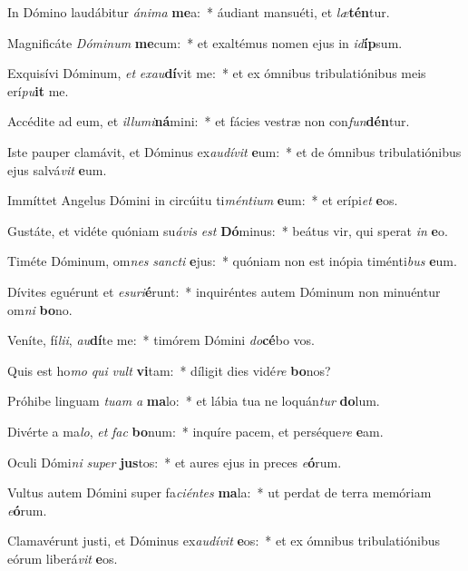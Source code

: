 \item In Dómino laudábitur \textit{á}\textit{ni}\textit{ma} \textbf{me}a:~* áudiant mansuéti, et \textit{læ}\textbf{tén}tur.
\item Magnificáte \textit{Dó}\textit{mi}\textit{num} \textbf{me}cum:~* et exaltémus nomen ejus in \textit{id}\textbf{íp}sum.
\item Exquisívi Dóminum, \textit{et} \textit{ex}\textit{au}\textbf{dí}vit me:~* et ex ómnibus tribulatiónibus meis erí\textit{pu}\textbf{it} me.
\item Accédite ad eum, et \textit{il}\textit{lu}\textit{mi}\textbf{ná}mini:~* et fácies vestræ non con\textit{fun}\textbf{dén}tur.
\item Iste pauper clamávit, et Dóminus ex\textit{au}\textit{dí}\textit{vit} \textbf{e}um:~* et de ómnibus tribulatiónibus ejus salvá\textit{vit} \textbf{e}um.
\item Immíttet Angelus Dómini in circúitu ti\textit{mén}\textit{ti}\textit{um} \textbf{e}um:~* et erípi\textit{et} \textbf{e}os.
\item Gustáte, et vidéte quóniam su\textit{á}\textit{vis} \textit{est} \textbf{Dó}minus:~* beátus vir, qui sperat \textit{in} \textbf{e}o.
\item Timéte Dóminum, om\textit{nes} \textit{sanc}\textit{ti} \textbf{e}jus:~* quóniam non est inópia timénti\textit{bus} \textbf{e}um.
\item Dívites eguérunt et \textit{e}\textit{su}\textit{ri}\textbf{é}runt:~* inquiréntes autem Dóminum non minuéntur om\textit{ni} \textbf{bo}no.
\item Veníte, fí\textit{li}\textit{i}, \textit{au}\textbf{dí}te me:~* timórem Dómini \textit{do}\textbf{cé}bo vos.
\item Quis est ho\textit{mo} \textit{qui} \textit{vult} \textbf{vi}tam:~* díligit dies vidé\textit{re} \textbf{bo}nos?
\item Próhibe linguam \textit{tu}\textit{am} \textit{a} \textbf{ma}lo:~* et lábia tua ne loquán\textit{tur} \textbf{do}lum.
\item Divérte a ma\textit{lo}, \textit{et} \textit{fac} \textbf{bo}num:~* inquíre pacem, et perséque\textit{re} \textbf{e}am.
\item Oculi Dómi\textit{ni} \textit{su}\textit{per} \textbf{jus}tos:~* et aures ejus in preces \textit{e}\textbf{ó}rum.
\item Vultus autem Dómini super fa\textit{ci}\textit{én}\textit{tes} \textbf{ma}la:~* ut perdat de terra memóriam \textit{e}\textbf{ó}rum.
\item Clamavérunt justi, et Dóminus ex\textit{au}\textit{dí}\textit{vit} \textbf{e}os:~* et ex ómnibus tribulatiónibus eórum liberá\textit{vit} \textbf{e}os.
